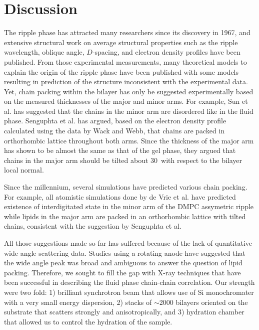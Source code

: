 \newpage
\section{Discussion}\label{sec:ripple_discussion}
The ripple phase has attracted many researchers since its discovery in 1967,
and extensive structural work on average structural properties such as 
the ripple wavelength, oblique angle, $D$-spacing, and electron density
profiles have been published. From those experimental measurements, 
many theoretical models to explain the origin of the ripple phase have 
been published with some models resulting in prediction of the structure
inconsistent with the experimental data. Yet, chain packing within the 
bilayer has only be suggested experimentally based on the measured thicknesses
of the major and minor arms. For example, Sun et al. has suggested that 
the chains in the minor arm are disordered like in the fluid phase.
Senguphta et al. has argued, based on the electron density profile calculated
using the data by Wack and Webb, that chains are packed in orthorhombic 
lattice throughout both arms. Since the thickness of the major arm has
shown to be almost the same as that of the gel phase, they argued that
chains in the major arm should be tilted about 30\textdegree\ with respect
to the bilayer local normal.

Since the millennium, several simulations
have predicted various chain packing. For example, all atomistic simulations
done by de Vrie et al. have predicted existence of interdigitated state in 
the minor arm of the DMPC assymetric ripple while lipids in the major arm
are packed in an orthorhombic lattice with tilted chains, consistent with 
the suggestion by Senguphta et al.  

All those suggestions made so far has suffered because of the lack of
quantitative wide angle scattering data. Studies using a rotating anode
have suggested that the wide angle peak was broad and ambiguous to answer
the question of lipid packing. Therefore, we sought to fill the gap
with X-ray techniques that have been successful in describing the fluid
phase chain-chain correlation. Our strength were two fold: 1) brilliant
synchrotron beam that allows use of Si monochromater with a very small
energy dispersion, 2) stacks of $\sim$2000 bilayers oriented on the substrate
that scatters strongly and anisotropically, and 3) hydration chamber that 
allowed us to control the hydration of the sample.

